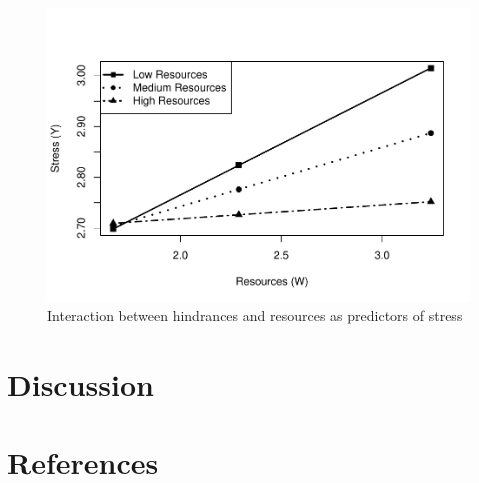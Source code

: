 \documentclass[
  man]{apa6}
\begin{document}
\begin{figure}
\centering
\includegraphics{SIOP_Onet_FA_files/figure-latex/analyses-1.pdf}
\caption{\label{fig:analyses}Interaction between hindrances and resources as predictors of stress}
\end{figure}

\hypertarget{discussion}{%
\section{Discussion}\label{discussion}}

\newpage

\hypertarget{references}{%
\section{References}\label{references}}

\begingroup
\setlength{\parindent}{-0.5in}
\setlength{\leftskip}{0.5in}
\end{document}

